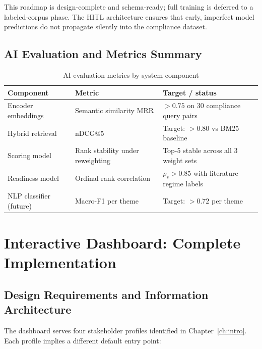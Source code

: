 This roadmap is design-complete and schema-ready; full training is deferred to a
labeled-corpus phase. The HITL architecture ensures that early, imperfect model
predictions do not propagate silently into the compliance dataset.

\subsection{AI Evaluation and Metrics Summary}
\label{sec:ai-eval-full}

\begin{table}[htbp]
\centering
\caption{AI evaluation metrics by system component}
\label{tab:ai-metrics}
\begin{tabular}{@{}p{3.2cm}p{2.8cm}p{5.2cm}@{}}
\toprule
\textbf{Component} & \textbf{Metric} & \textbf{Target / status} \\
\midrule
Encoder embeddings & Semantic similarity MRR & $>0.75$ on 30 compliance query pairs \\
Hybrid retrieval & nDCG@5 & Target: $>0.80$ vs BM25 baseline \\
Scoring model & Rank stability under reweighting & Top-5 stable across all 3 weight sets \\
Readiness model & Ordinal rank correlation & $\rho_s > 0.85$ with literature regime labels \\
NLP classifier (future) & Macro-F1 per theme & Target: $>0.72$ per theme \\
\bottomrule
\end{tabular}
\end{table}

\section{Interactive Dashboard: Complete Implementation}
\label{sec:dash-full}

\subsection{Design Requirements and Information Architecture}
\label{sec:dash-ia}

The dashboard serves four stakeholder profiles identified in
Chapter~\ref{ch:intro}. Each profile implies a different default entry point:

